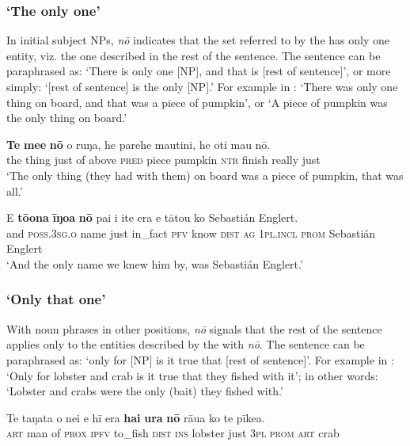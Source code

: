 \subsubsection{‘The only one’}\label{sec:5.8.2.1}

In initial subject NPs, \textit{nō} indicates that the set referred to by the  has only one entity, viz. the one described in the rest of the sentence. The sentence can be paraphrased as: ‘There is only one [NP], and that is [rest of sentence]’, or more simply: ‘[rest of sentence] is the only [NP].’ For example in : ‘There was only one thing on board, and that was a piece of pumpkin’, or ‘A piece of pumpkin was the only thing on board.’ 

\ea\label{ex:5.144}
\gll \textbf{Te} \textbf{me{\ꞌ}e} \textbf{nō} o ruŋa, he parehe mautini, he oti mau nō. \\
the thing just of above \textsc{pred} piece pumpkin \textsc{ntr} finish really just \\

\glt 
‘The only thing (they had with them) on board was a piece of pumpkin, that was all.’ \textstyleExampleref{[R303.054]} 
\z

\ea\label{ex:5.145}
\gll {\ꞌ}E \textbf{tō{\ꞌ}ona} \textbf{{\ꞌ}īŋoa} \textbf{nō} pa{\ꞌ}i i {\ꞌ}ite era e tātou ko Sebastián Englert. \\
and \textsc{poss.3sg.o} name just in\_fact \textsc{pfv} know \textsc{dist} \textsc{ag} \textsc{1pl.incl} \textsc{prom} Sebastián Englert \\

\glt 
‘And the only name we knew him by, was Sebastián Englert.’ \textstyleExampleref{[R375.005]} 
\z

\subsubsection{‘Only that one’}\label{sec:5.8.2.2}

With noun phrases in other positions, \textit{nō} signals that the rest of the sentence applies only to the entities described by the  with \textit{nō}. The sentence can be paraphrased as: ‘only for [NP] is it true that [rest of sentence]’. For example in : ‘Only for lobster and crab is it true that they fished with it’; in other words: ‘Lobster and crabs were the only (bait) they fished with.’

\ea\label{ex:5.146}
\gll Te taŋata o nei e hī era \textbf{hai} \textbf{{\ꞌ}ura} \textbf{nō} rāua ko te pīkea. \\
\textsc{art} man of \textsc{prox} \textsc{ipfv} to\_fish \textsc{dist} \textsc{ins} lobster just \textsc{3pl} \textsc{prom} \textsc{art} crab \\

